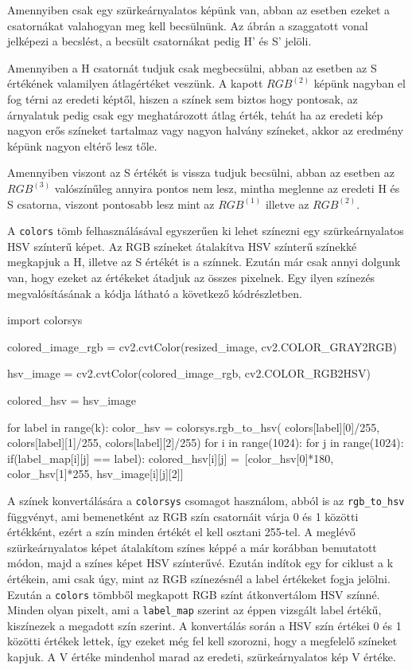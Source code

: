 Amennyiben csak egy szürkeárnyalatos képünk van, abban az esetben ezeket a csatornákat valahogyan meg kell becsülnünk. Az ábrán a szaggatott vonal jelképezi a becslést, a becsült csatornákat pedig H' és S' jelöli. 

Amennyiben a H csatornát tudjuk csak megbecsülni, abban az esetben az S értékének valamilyen átlagértéket veszünk. A kapott $RGB^{(2)}$ képünk nagyban el fog térni az eredeti képtől, hiszen a színek sem biztos hogy pontosak, az árnyalatuk pedig csak egy meghatározott átlag érték, tehát ha az eredeti kép nagyon erős színeket tartalmaz vagy nagyon halvány színeket, akkor az eredmény képünk nagyon eltérő lesz tőle.

Amennyiben viszont az S értékét is vissza tudjuk becsülni, abban az esetben az $RGB^{(3)}$ valószínűleg annyira pontos nem lesz, mintha meglenne az eredeti H és S csatorna, viszont pontosabb lesz mint az $RGB^{(1)}$ illetve az $RGB^{(2)}$.

A \texttt{colors} tömb felhasználásával egyszerűen ki lehet színezni egy szürkeárnyalatos HSV színterű képet. Az RGB színeket átalakítva HSV színterű színekké megkapjuk a H, illetve az S értékét is a színnek. Ezután már csak annyi dolgunk van, hogy ezeket az értékeket átadjuk az összes pixelnek. Egy ilyen színezés megvalósításának a kódja látható a következő kódrészletben. 
\begin{python}
import colorsys

colored_image_rgb = cv2.cvtColor(resized_image, cv2.COLOR_GRAY2RGB)

hsv_image = cv2.cvtColor(colored_image_rgb, cv2.COLOR_RGB2HSV)

colored_hsv = hsv_image

for label in range(k):
    color_hsv = colorsys.rgb_to_hsv(
        colors[label][0]/255,
        colors[label][1]/255,
        colors[label][2]/255)
    for i in range(1024):
        for j in range(1024):
            if(label_map[i][j] == label):
                colored_hsv[i][j] =\
                [color_hsv[0]*180, color_hsv[1]*255, hsv_image[i][j][2]]
\end{python} 

A színek konvertálására a \texttt{colorsys} csomagot használom, abból is az \texttt{rgb\_to\_hsv} függvényt, ami bemenetként az RGB szín csatornáit várja 0 és 1 közötti értékként, ezért a szín minden értékét el kell osztani 255-tel. A meglévő szürkeárnyalatos képet átalakítom színes képpé a már korábban bemutatott módon, majd a színes képet HSV színterűvé. Ezután indítok egy for ciklust a k értékein, ami csak úgy, mint az RGB színezésnél a label értékeket fogja jelölni. Ezután a \texttt{colors} tömbből megkapott RGB színt átkonvertálom HSV színné. Minden olyan pixelt, ami a \texttt{label\_map} szerint az éppen vizsgált label értékű, kiszínezek a megadott szín szerint. A konvertálás során a HSV szín értékei 0 és 1 közötti értékek lettek, így ezeket még fel kell szorozni, hogy a megfelelő színeket kapjuk. A V értéke mindenhol marad az eredeti, szürkeárnyalatos kép V értéke.

